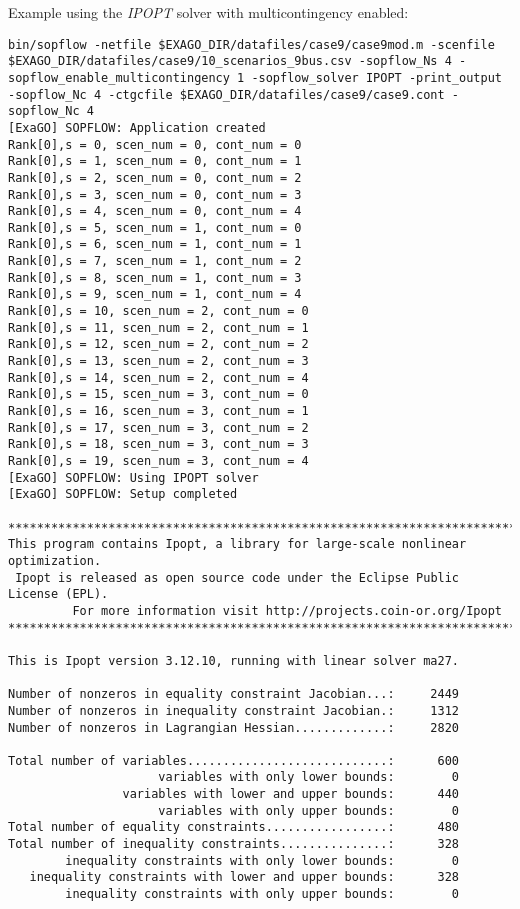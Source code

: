 Example using the \emph{IPOPT} solver with multicontingency enabled:

\begin{lstlisting}
bin/sopflow -netfile $EXAGO_DIR/datafiles/case9/case9mod.m -scenfile $EXAGO_DIR/datafiles/case9/10_scenarios_9bus.csv -sopflow_Ns 4 -sopflow_enable_multicontingency 1 -sopflow_solver IPOPT -print_output -sopflow_Nc 4 -ctgcfile $EXAGO_DIR/datafiles/case9/case9.cont -sopflow_Nc 4
[ExaGO] SOPFLOW: Application created
Rank[0],s = 0, scen_num = 0, cont_num = 0
Rank[0],s = 1, scen_num = 0, cont_num = 1
Rank[0],s = 2, scen_num = 0, cont_num = 2
Rank[0],s = 3, scen_num = 0, cont_num = 3
Rank[0],s = 4, scen_num = 0, cont_num = 4
Rank[0],s = 5, scen_num = 1, cont_num = 0
Rank[0],s = 6, scen_num = 1, cont_num = 1
Rank[0],s = 7, scen_num = 1, cont_num = 2
Rank[0],s = 8, scen_num = 1, cont_num = 3
Rank[0],s = 9, scen_num = 1, cont_num = 4
Rank[0],s = 10, scen_num = 2, cont_num = 0
Rank[0],s = 11, scen_num = 2, cont_num = 1
Rank[0],s = 12, scen_num = 2, cont_num = 2
Rank[0],s = 13, scen_num = 2, cont_num = 3
Rank[0],s = 14, scen_num = 2, cont_num = 4
Rank[0],s = 15, scen_num = 3, cont_num = 0
Rank[0],s = 16, scen_num = 3, cont_num = 1
Rank[0],s = 17, scen_num = 3, cont_num = 2
Rank[0],s = 18, scen_num = 3, cont_num = 3
Rank[0],s = 19, scen_num = 3, cont_num = 4
[ExaGO] SOPFLOW: Using IPOPT solver
[ExaGO] SOPFLOW: Setup completed

******************************************************************************
This program contains Ipopt, a library for large-scale nonlinear optimization.
 Ipopt is released as open source code under the Eclipse Public License (EPL).
         For more information visit http://projects.coin-or.org/Ipopt
******************************************************************************

This is Ipopt version 3.12.10, running with linear solver ma27.

Number of nonzeros in equality constraint Jacobian...:     2449
Number of nonzeros in inequality constraint Jacobian.:     1312
Number of nonzeros in Lagrangian Hessian.............:     2820

Total number of variables............................:      600
                     variables with only lower bounds:        0
                variables with lower and upper bounds:      440
                     variables with only upper bounds:        0
Total number of equality constraints.................:      480
Total number of inequality constraints...............:      328
        inequality constraints with only lower bounds:        0
   inequality constraints with lower and upper bounds:      328
        inequality constraints with only upper bounds:        0


\end{lstlisting}
